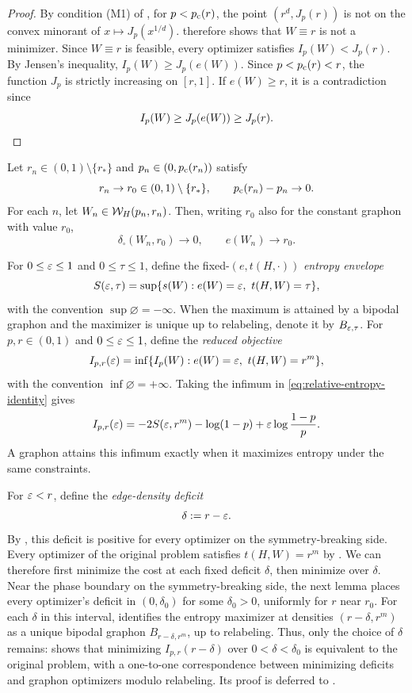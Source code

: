\begin{proof}
By condition (M1) of , for $p<p_{\mathrm c}(r)$, the point $(r^d,J_p(r))$ is not on the convex minorant of
$x\mapsto J_p(x^{1/d})$.  therefore shows that $W\equiv r$ is not a
minimizer. Since $W\equiv r$ is feasible, every optimizer satisfies $I_p(W)<J_p(r)$.
By Jensen's inequality,
$
  I_p(W)\ge J_p(e(W)).
$
Since $p<p_{\mathrm c}(r)<r$, the function $J_p$ is strictly increasing on $[r,1]$.
If $e(W)\ge r$, it is a contradiction since
\[
  I_p(W)\ge J_p(e(W))\ge J_p(r).
  \qedhere
\]
\end{proof}

\begin{lemma}\label{lem:boundary-convergence}
Let $r_n\in(0,1)\setminus\{r_*\}$ and $p_n\in(0,p_{\mathrm c}(r_n))$ satisfy
\[
  r_n\to r_0\in(0,1)\setminus\{r_*\},
  \qquad
  p_{\mathrm c}(r_n)-p_n\to0.
\]
For each $n$, let $W_n\in\mathcal W_H(p_n,r_n)$.  Then, writing $r_0$ also for the constant
graphon with value $r_0$,
\[
  \delta_\square(W_n,r_0)\to0,
  \qquad
  e(W_n)\to r_0.
\]
\end{lemma}

For $0\le\varepsilon\le1$ and $0\le\tau\le1$, define the fixed-$(e,t(H,\cdot))$ \emph{entropy
envelope}
\begin{equation}\label{eq:fixed-density-entropy}
  S(\varepsilon,\tau)=
  \sup\{s(W):e(W)=\varepsilon,\ t(H,W)=\tau\},
\end{equation}
with the convention $\sup\varnothing=-\infty$.
When the maximum is attained by a bipodal graphon and
the maximizer is unique up to relabeling, denote it by $B_{\varepsilon,\tau}$.
For $p,r\in(0,1)$ and $0\le\varepsilon\le1$, define the \emph{reduced objective}
\begin{equation}\label{eq:reduced-objective}
  I_{p,r}(\varepsilon)=
  \inf\{I_p(W):e(W)=\varepsilon,\ t(H,W)=r^m\},
\end{equation}
with the convention $\inf\varnothing=+\infty$.
Taking the infimum in \eqref{eq:relative-entropy-identity} gives
\[
  I_{p,r}(\varepsilon)
  =-2S(\varepsilon,r^m)-\log(1-p)+\varepsilon\log\frac{1-p}{p}.
\]
A graphon attains this infimum exactly when it maximizes entropy under
the same constraints.

For $\varepsilon<r$, define the \emph{edge-density deficit}
\[
  \delta:=r-\varepsilon.
\]
By ,
this deficit is positive for every optimizer on the symmetry-breaking side.
Every optimizer of the original problem satisfies $t(H,W)=r^m$ by
.  We can therefore first minimize the cost at
each fixed deficit $\delta$, then minimize over $\delta$.
Near the phase boundary on the symmetry-breaking side, the next lemma
places every optimizer's deficit in $(0,\delta_0)$ for some $\delta_0>0$,
uniformly for $r$ near $r_0$.  For each $\delta$ in this interval,
 identifies the entropy maximizer at
densities $(r-\delta,r^m)$ as a unique bipodal graphon $B_{r-\delta,r^m}$,
up to relabeling.
Thus, only the choice of $\delta$ remains:  shows
that minimizing $I_{p,r}(r-\delta)$ over $0<\delta<\delta_0$ is equivalent to the
original problem, with a one-to-one correspondence between minimizing deficits
and graphon optimizers modulo relabeling.
Its proof is deferred to .

